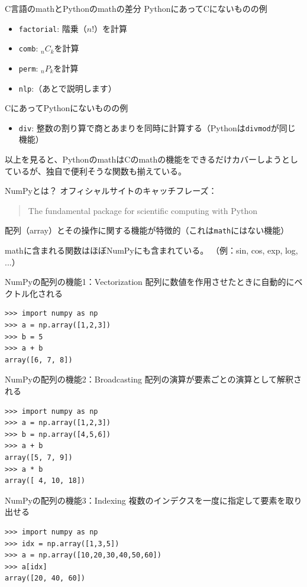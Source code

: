 \documentclass[unicode,lualatex,aspectratio=169]{beamer}
\begin{document}
\begin{frame}[fragile]{C言語のmathとPythonのmathの差分}
\noindent
PythonにあってCにないものの例
\begin{itemize}
\item \verb|factorial|: 階乗（$n!$）を計算
\item \verb|comb|: ${}_nC_k$を計算
\item \verb|perm|: ${}_nP_k$を計算
\item \verb|nlp|:（あとで説明します）
\end{itemize}
CにあってPythonにないものの例
\begin{itemize}
\item \verb|div|: 整数の割り算で商とあまりを同時に計算する（Pythonは\verb|divmod|が同じ機能）
\end{itemize}
以上を見ると、PythonのmathはCのmathの機能をできるだけカバーしようとしているが、独自で便利そうな関数も揃えている。
\end{frame}
\begin{frame}[fragile]{NumPyとは？}
  オフィシャルサイトのキャッチフレーズ：
  \begin{quote}
    The fundamental package for scientific computing with Python
  \end{quote}

  配列（array）とその操作に関する機能が特徴的（これは\verb|math|にはない機能）


  mathに含まれる関数はほぼNumPyにも含まれている。
  （例：sin, cos, exp, log, ...）
\end{frame}
\begin{frame}[fragile]{NumPyの配列の機能1：Vectorization}
配列に数値を作用させたときに自動的にベクトル化される  
\fontsize{10pt}{10pt}\selectfont    
\begin{verbatim}
>>> import numpy as np
>>> a = np.array([1,2,3])
>>> b = 5
>>> a + b
array([6, 7, 8])
\end{verbatim}
\end{frame}
\begin{frame}[fragile]{NumPyの配列の機能2：Broadcasting}
配列の演算が要素ごとの演算として解釈される
\fontsize{10pt}{10pt}\selectfont    
\begin{verbatim}
>>> import numpy as np
>>> a = np.array([1,2,3])
>>> b = np.array([4,5,6])
>>> a + b
array([5, 7, 9])
>>> a * b
array([ 4, 10, 18])
\end{verbatim}
\end{frame}
\begin{frame}[fragile]{NumPyの配列の機能3：Indexing}
  複数のインデクスを一度に指定して要素を取り出せる
\fontsize{10pt}{10pt}\selectfont    
\begin{verbatim}
>>> import numpy as np
>>> idx = np.array([1,3,5])
>>> a = np.array([10,20,30,40,50,60])
>>> a[idx]
array([20, 40, 60])
\end{verbatim}  
\end{frame}
\end{document}
